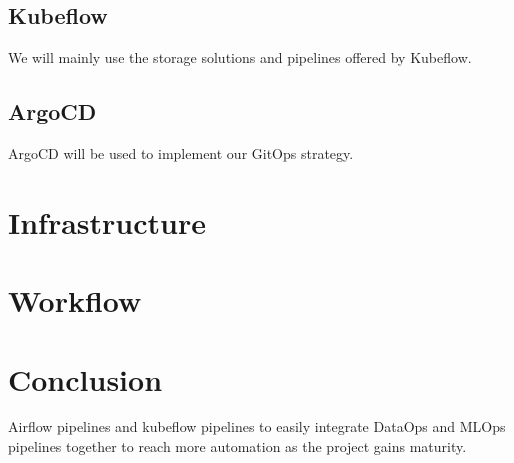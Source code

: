 \subsection{Kubeflow}\label{subsec:kubeflow}
We will mainly use the storage solutions and pipelines offered by Kubeflow.

\subsection{ArgoCD}\label{subsec:argocd}
ArgoCD will be used to implement our GitOps strategy.

\section{Infrastructure}\label{sec:infrastructure}


\section{Workflow}\label{sec:workflow}


\section{Conclusion}\label{sec:conclusion}
Airflow pipelines and kubeflow pipelines to easily integrate DataOps and MLOps pipelines together to reach more automation as the project gains maturity.
